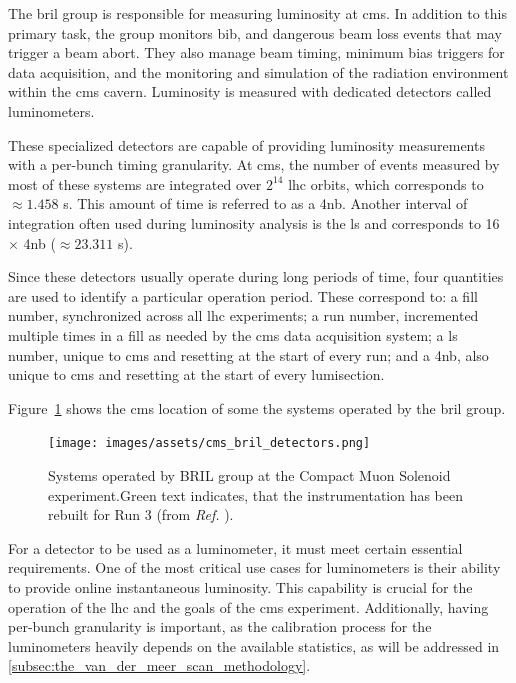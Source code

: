 

The \acrfull{bril} group is responsible for measuring luminosity at \acrshort{cms}. In addition to this primary task, the group monitors \acrfull{bib}, and dangerous beam loss events that may trigger a beam abort. They also manage beam timing, minimum bias triggers for data acquisition, and the monitoring and simulation of the radiation environment within the \acrshort{cms} cavern. Luminosity is measured with dedicated detectors called luminometers.

These specialized detectors are capable of providing luminosity measurements with a per-bunch timing granularity. At \acrshort{cms}, the number of events measured by most of these systems are integrated over $2^{14}$ \acrshort{lhc} orbits, which corresponds to $\approx 1.458$ s. This amount of time is referred to as a \acrfull{4nb}. Another interval of integration often used during luminosity analysis is the \acrfull{ls} and corresponds to 16 $\times$ \acrshort{4nb} ($\approx 23.311$ s).

Since these detectors usually operate during long periods of time, four quantities are used to identify a particular operation period. These correspond to: a fill number, synchronized across all \acrshort{lhc} experiments; a run number, incremented multiple times in a fill as needed by the \acrshort{cms} data acquisition system; a \acrshort{ls} number, unique to \acrshort{cms} and resetting at the start of every run; and a \acrshort{4nb}, also unique to \acrshort{cms} and resetting at the start of every lumisection.

Figure~\ref{fig:cms_bril_detectors} shows the \acrshort{cms} location of some the systems operated by the \acrshort{bril} group.

\begin{figure}[h]
	\centering
	\texttt{[image: images/assets/cms\_bril\_detectors.png]}
	\caption[BRIL systems at CMS]{Systems operated by BRIL group at the Compact Muon Solenoid experiment.Green text indicates, that the instrumentation has been rebuilt for Run 3 (from \textit{Ref.} \cite{Saariokari:2826125}).}
	\label{fig:cms_bril_detectors}
\end{figure}

For a detector to be used as a luminometer, it must meet certain essential requirements. One of the most critical use cases for luminometers is their ability to provide online instantaneous luminosity. This capability is crucial for the operation of the \acrshort{lhc} and the goals of the \acrshort{cms} experiment. Additionally, having per-bunch granularity is important, as the calibration process for the luminometers heavily depends on the available statistics, as will be addressed in \autoref{subsec:the_van_der_meer_scan_methodology}.

